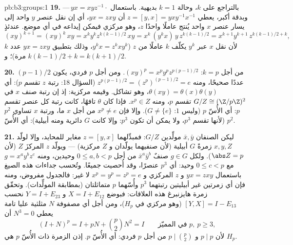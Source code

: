 \begin{solution}{pb:b3:groups:1}
\textbf{19.} بالتراجع على $k$، وحالة $k = 1$ بديهية. باستعمال
$yx = xyz^{-1}\cdot$\,--- وبدقة أكبر، يعطي $z = [y, x] =
yxy^{-1}x^{-1}$ أن $yx = zxy$، أي إن نقل
عنصر $y$ واحد إلى يسار عنصر $x$ واحد يُنتج عاملًا واحدًا $z$، وهو
مركزي فيمكن إيداعه في أي موضع. عندئذٍ
\[
(xy)^{k+1} = (xy)^k\,xy = x^ky^kz^{k(k-1)/2}\,xy
= x^k\,(y^kx)\,y\,z^{k(k-1)/2}
= x^{k+1}y^{k+1}\,z^{k(k-1)/2 + k},
\]
لأن نقل $x$ عبر $y^k$ يكلّف $k$ عاملًا من $z$ ($y^kx =
z^kxy^k$، وذلك
بتطبيق $yx = zxy$ عدد $k$ مرة)؛ و $k(k-1)/2 + k
= k(k+1)/2$.

\textbf{20.} من أجل $k = p$: $(xy)^p = x^py^pz^{p(p-1)/2}$. ومن أجل $p$ فردي، يكون
$(p-1)/2$ عددًا صحيحًا، ومنه $z^{p(p-1)/2} =
(z^p)^{(p-1)/2} = e$ (السؤال 18: رتبة $z$ تقسم
$p$): أي $\theta(xy) = \theta(x)\theta(y)$، وهو تشاكل. وقيمه مركزية: إذ إن رتبة صنف $x$
في $G/Z \cong (\Z/p\Z)^2$ تقسم $p$، ومنه $x^p \in Z$. فإذا كان $\theta$ تافهًا،
كانت رتبة كل عنصر تقسم $p$: أي الأُسّ $p$ (وليس $1$: $G \neq
\{e\}$).
وإلا فإن $x^p \neq e$ من أجل $x$ ما، ورتبة $x$ تساوي $p^2$
(لأنها تقسم $p^3$، ولا يمكن أن تكون $p^3$: وإلا كانت $G$ دائرية
ومنه أبيلية): أي الأُسّ $p^2$.

\textbf{21.} ليكن الصنفان $\bar x, \bar y$ مولِّدين  $G/Z$:
فمبدِّلهما $z = [y, x]$ مغاير للمحايد، وإلا لولّد $x, y, Z$ زمرةً
$G$ أبيلية (لأن صنفيهما يولّدان  و $Z$ مركزية) ---
ويولّد $z$ المركزَ $Z$ (لأن $\abs Z = p$). ولكل $g \in G$ صنفٌ
$\bar x^a\bar y^b$ من أجل $0 \leq a, b <
p$ وحيدين، ومنه $g = x^ay^bz^c$ مع
$0 \leq c < p$ وحيد: أي $p^3$ عنصرًا، وقد أُحصيت جميعًا. وتُحسب
جداءات هذه الصيغ  باستعمال $yx = zxy$ و $z$ المركزي
و $x^p = y^p =
z^p = e$ لا غير: فالجدول مفروض، ومنه فإن أي زمرتين غير أبيليتين
رتبتهما $p^3$ وأُسّهما $p$ متماثلتان (بمطابقة المولِّدات). وتحقّق
زمرة هايزنبرغ هذه العلاقات: فبوضع $X = I + E_{12}$ و
$Y = I + E_{23}$ نحسب $[Y, X] = I -
E_{13}$ (وهو مركزي في $H_p$)، ومن أجل أي
مصفوفة $N$ مثلثية عليا تامة يعطي $N^3 = 0$ أن
\[
(I + N)^p = I + pN + \binom p2N^2 = I
\qquad\text{في المميّز } p,\ p \geq 3,
\]
لأن $p \mid p$ و $p \mid \binom p2$ من أجل $p$ فردي: أي الأُسّ $p$. إذن
الزمرة ذات الأُسّ $p$ هي $H_p$.


\end{solution}
